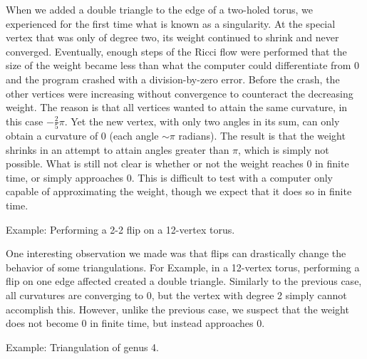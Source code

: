 \documentclass[12pt]{article}
\begin{document}
\noindent When we added a double triangle to the edge of a two-holed torus, we experienced for the first time what is known as a singularity. At the special vertex that was only of degree two, its weight continued to shrink and never converged. Eventually, enough steps of the Ricci flow were performed that the size of the weight became less than what the computer could differentiate from 0 and the program crashed with a division-by-zero error. Before the crash, the other vertices were increasing without convergence to counteract the decreasing weight. The reason is that all vertices wanted to attain the same curvature, in this case $-\frac{2}{5}\pi$. Yet the new vertex, with only two angles in its sum, can only obtain a curvature of 0 (each angle $\sim\pi$ radians). The result is that the weight shrinks in an attempt to attain angles greater than $\pi$, which is simply not possible. What is still not clear is whether or not the weight reaches 0 in finite time, or simply approaches 0. This is difficult to test with a computer only capable of approximating the weight, though we expect that it does so in finite time.\newline

\noindent Example: Performing a 2-2 flip on a 12-vertex torus. \newline

\noindent One interesting observation we made was that flips can drastically change the behavior of some triangulations. For Example, in a 12-vertex torus, performing a flip on one edge affected created a double triangle. Similarly to the previous case, all curvatures are converging to 0, but the vertex with degree 2 simply cannot accomplish this. However, unlike the previous case, we suspect that the weight does not become 0 in finite time, but instead approaches 0.\newline

\noindent Example: Triangulation of genus 4.\newline
\end{document}
